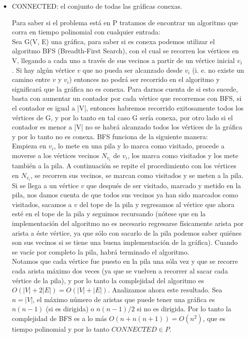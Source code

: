 \documentclass[12pt]{article}
\begin{document}
 \begin{itemize}
  \item CONNECTED: el conjunto de todas las gráficas conexas.
  
    Para saber si el problema está en P tratamos de encontrar un algoritmo que corra en tiempo polinomial con cualquier entrada: \\
    Sea G(V, E) una gráfica, para saber si es conexa podemos utilizar el algoritmo BFS (Breadth-First Search), con el cual se recorren los vértices en V, llegando a cada uno a través de sus vecinos a partir de un vértice inicial $v_i$. Si hay algún vértice $v$ que no pueda ser alcanzado desde $v_i$ (i. e. no existe un camino entre $v$ y $v_i$) entonces no podrá ser recorrido en el algoritmo y significará que la gráfica no es conexa. Para darnos cuenta de si esto sucede, basta con aumentar un contador por cada vértice que recorremos con BFS, si el contador es igual a |V|, entonces habremos recorrido exitosamente todos los vértices de G, y por lo tanto en tal caso G sería conexa, por otro lado si el contador es menor a |V| no se habrá alcanzado todos los vértices de la gráfica y por lo tanto no es conexa. BFS funciona de la siguiente manera: \\
    
    Empieza en $v_i$, lo mete en una pila y lo marca como visitado, procede a moverse a los vértices vecinos $N_{v_i}$ de $v_i$, los marca como visitados y los mete también a la pila. A continuación se repite el procedimiento con los vértices en $N_{v_i}$, se recorren sus vecinos, se marcan como visitados y se meten a la pila. Si se llega a un vértice $v$ que después de ser visitado, marcado y metido en la pila, nos damos cuenta de que todos sus vecinos ya han sido marcados como visitados, sacamos a $v$ del tope de la pila y regresamos al vértice que ahora esté en el tope de la pila y seguimos recursando (nótese que en la implementación del algoritmo no es necesario regresarse físicamente arista por arista a éste vértice, ya que sólo con sacarlo de la pila podemos saber quiénes son sus vecinos si se tiene una buena implementación de la gráfica). Cuando se vacíe por completo la pila, habrá terminado el algoritmo.\\
    
    Notamos que cada vértice fue puesto en la pila una sóla vez y que se recorre cada arista máximo dos veces (ya que se vuelven a recorrer al sacar cada vértice de la pila), y por lo tanto la complejidad del algoritmo es $O(|V| + 2|E|) = O(|V| + |E|)$. Analizamos ahora este resultado. Sea $n = |V|$, el máximo número de aristas que puede tener una gráfica es $n (n - 1)$ (si es dirigida) o $n (n - 1) / 2$ si no es dirigida. Por lo tanto la complejidad de BFS es a lo más $O(n + n (n + 1)) = O(n^2)$, que es tiempo polinomial y por lo tanto $CONNECTED \in P$.
  

\end{itemize}
\end{document}
